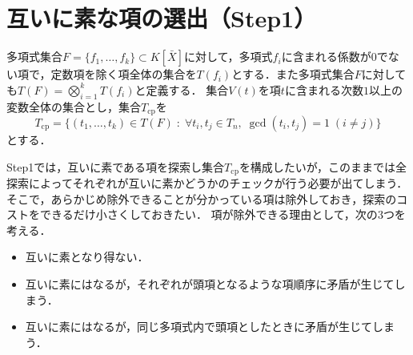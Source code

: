 \section{互いに素な項の選出（Step1）}
多項式集合$F = \{f_1, \dots, f_k\}\subset K[\bar{X}]$に対して，多項式$f_i$に含まれる係数が$0$でない項で，定数項を除く項全体の集合を$T(f_i)$とする．また多項式集合$F$に対しても$\displaystyle T(F) = \bigotimes_{i=1}^k T(f_i)$と定義する．
集合$V(t)$を項$t$に含まれる次数$1$以上の変数全体の集合とし，集合$T_{\mathrm{cp}}$を
$$
T_{\mathrm{cp}} = \{ (t_1, \dots, t_k)\in T(F) \;:\; \forall t_i, t_j \in T_n, \; \gcd(t_i,  t_j)=1\; (i\ne j) \}
$$
とする．
\par
Step1では，互いに素である項を探索し集合$T_{\mathrm{cp}}$を構成したいが，このままでは全探索によってそれぞれが互いに素かどうかのチェックが行う必要が出てしまう．
そこで，あらかじめ除外できることが分かっている項は除外しておき，探索のコストをできるだけ小さくしておきたい．
項が除外できる理由として，次の$3$つを考える．
\begin{itemize}
	\item 互いに素となり得ない．
	\item 互いに素にはなるが，それぞれが頭項となるような項順序に矛盾が生じてしまう．
	\item 互いに素にはなるが，同じ多項式内で頭項としたときに矛盾が生じてしまう．
\end{itemize}
